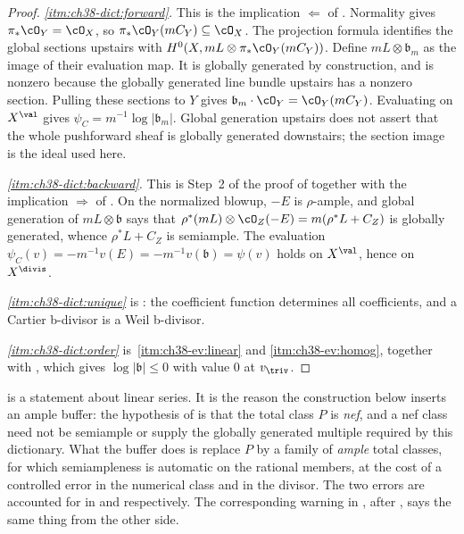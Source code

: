 \begin{proof}
\emph{\cref{itm:ch38-dict:forward}.} This is the implication
$\Leftarrow$ of . Normality gives
$\pi_*\cO_Y=\cO_X$, so
$\pi_*\cO_Y(mC_Y)\subseteq\cO_X$. The projection formula identifies
the global sections upstairs with
$H^0(X,mL\otimes\pi_*\cO_Y(mC_Y))$. Define
$mL\otimes\mathfrak b_m$ as the image of their evaluation map.
It is globally generated by construction, and is nonzero because
the globally generated line bundle upstairs has a nonzero section.
Pulling these sections to $Y$ gives
$\mathfrak b_m\cdot\cO_Y=\cO_Y(mC_Y)$. Evaluating on $X^{\val}$ gives
$\psi_C=m^{-1}\log|\mathfrak b_m|$.
Global generation upstairs does not assert that the whole
pushforward sheaf is globally generated downstairs; the section
image is the ideal used here.

\emph{\cref{itm:ch38-dict:backward}.}  This is Step~2 of the proof of
 together with the implication
$\Rightarrow$ of .  On the normalized
blowup, $-E$ is $\rho$-ample, and global generation of
$mL\otimes\mathfrak b$ says that
$\rho^*(mL)\otimes\cO_Z(-E)=m(\rho^*L+C_Z)$ is globally generated,
whence $\rho^*L+C_Z$ is semiample.  The evaluation
$\psi_C(v)=-m^{-1}v(E)=-m^{-1}v(\mathfrak b)=\psi(v)$ holds on
$X^{\val}$, hence on $X^{\divis}$.

\emph{\cref{itm:ch38-dict:unique}} is
: the coefficient function
determines all coefficients, and a Cartier b-divisor is a Weil b-divisor.

\emph{\cref{itm:ch38-dict:order}} is
\,\cref{itm:ch38-ev:linear} and
\cref{itm:ch38-ev:homog}, together with
, which gives
$\log|\mathfrak b|\leq0$ with value $0$ at $v_{\triv}$.
\end{proof}

\begin{remark}
\label{rem:ch38-semiample-not-nef}
 is a statement about linear series.
It is the reason the construction below inserts an ample buffer: the
hypothesis of  is that the total
class $P$ is \emph{nef}, and a nef class need not be semiample or supply the globally
generated multiple required by this dictionary.  What the buffer does is replace $P$ by a family of
\emph{ample} total classes, for which semiampleness is automatic on the
rational members, at the cost of a controlled error in the numerical class
and in the divisor.  The two errors are accounted for in
 and  respectively.
The corresponding warning in
, after
, says the same thing from the other
side.
\end{remark}

